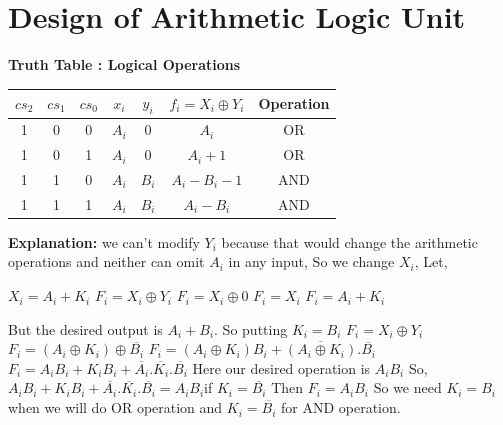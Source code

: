 \documentclass[]{article}
\begin{document}
	\section{Design of Arithmetic Logic Unit}
	\textbf{Truth Table : Logical Operations}
		\begin{center}
		\begin{tabular}{ |c|c|c|c|c|c|c| } 
			\hline
			$cs_2$ & $cs_1$ & $cs_0$ & $x_i$ & $y_i$ & $f_i=X_i \oplus Y_i$ & Operation \\
			\hline
			
			\hline
			1 & 0 & 0 & $A_i$ & $0$ & $A_i$ & OR \\
			\hline
			
			\hline
			1 & 0 & 1 & $A_i$ & $0$ & $A_i+1$ & OR \\
			\hline
			
			\hline
			1 & 1 & 0 & $A_i$ & $B_i$ & $A_i-B_i-1$ & AND \\
			\hline
			
			\hline
			1 & 1 & 1 & $A_i$ & $B_i$ & $A_i-B_i$ & AND\\
			\hline
		\end{tabular}
	\end{center}

	\textbf{Explanation:}\newline
	we can't modify $Y_i$ because that would change the arithmetic operations
	and neither can omit $A_i$ in any input, So we change $X_i$,\newline
	Let,

	$X_i=A_i+K_i$ \newline
	$F_i=X_i \oplus Y_i$ \newline
	$F_i=X_i \oplus 0$ \newline
	$F_i=X_i$ \newline
	$F_i=A_i+K_i$\newline
	
	But the desired output is $A_i+B_i$. So putting $K_i=B_i$ \newline
	$F_i=X_i \oplus Y_i$\newline
	$F_i=(A_i \oplus K_i) \oplus \overline{B_i}$\newline
	$F_i=(A_i \oplus K_i)B_i + \overline{(A_i \oplus K_i)} .\overline{B_i}$\newline
	$F_i=A_iB_i + K_iB_i + \overline{A_i}.\overline{K_i}.\overline{B_i}$ \newline Here our desired operation is $A_iB_i$ \newline
	So, $A_iB_i + K_iB_i + \overline{A_i}.\overline{K_i}.\overline{B_i} = A_iB_i$\newline if $K_i=\overline{B_i}$	Then $F_i=A_iB_i$\newline
	So we need $K_i=B_i$ when we will do OR operation and $K_i=\overline{B_i}$ for AND operation.
	
\end{document}
